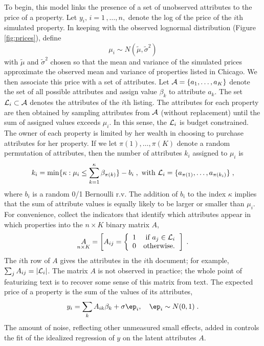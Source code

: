 \documentclass[12pt]{article}
\begin{document}
To begin, this model links the presence of a set of unobserved attributes to the price of a property.  Let $y_i, \, i = 1\,,\ldots, n,$ denote the log of the price of the $i$th simulated property.  In keeping with the observed lognormal distribution (Figure \ref{fig:prices}), define
\begin{equation}
	\mu_i \sim N(\tilde\mu, \tilde\sigma^2)
\end{equation}
with $\tilde\mu$ and $\tilde\sigma^2$ chosen so that the mean and variance of the simulated prices approximate the observed mean and variance of properties listed in Chicago.  We then associate this price with a set of attributes.  Let ${\cal A} = \{a_1,\ldots, a_K\}$ denote the set of  all possible attributes and assign value $\beta_k$ to attribute $a_k$.  The set ${\cal L}_i \subset {\cal A}$ denotes the attributes of the $i$th listing.  The attributes for each property are then obtained by sampling attributes from $\cal A$ (without replacement) until the sum of assigned values exceeds $\mu_i$.  In this sense, the ${\cal L}_i$ is budget constrained. The owner of each property is limited by her wealth in choosing to purchase attributes for her property.  If we let $\pi(1), \ldots, \pi(K)$ denote a random permutation of attributes, then the number of attributes $k_i$ assigned to $\mu_i$ is 
\begin{equation}
	k_i = \min \{ \kappa:  \mu_i \le \sum_{k=1}^{\kappa} \beta_{\pi(k)} \} - b_i \;,
	\mbox{ with }
	{\cal L}_i = \{a_{\pi(1)}, \ldots, a_{\pi(k_i)} \} \;,
\end{equation}
where $b_i$ is a random 0/1 Bernoulli r.v.  The addition of $b_i$ to the index $\kappa$ implies that the sum of attribute values is equally likely to be larger or smaller than $\mu_i$.  For convenience,  collect the indicators that identify which attributes appear in which properties into the $n \times K$ binary matrix $A$,
\begin{equation}
  \underset{n \times K}{A} = \left[ A_{ij} =
              \left\{ \begin{array}{cc} 1 & \mbox{ if } a_j \in {\cal L}_i \cr 0 & \mbox{otherwise.} 
                       \end{array} \right. \right]  \;.
\end{equation}
The $i$th row of $A$ gives the attributes in the $i$th document; for example, $\sum_j A_{ij} = |{\cal L}_i|$. The matrix $A$ is not observed in practice; the whole point of featurizing text is to recover some sense of this matrix from text. The expected price of a property is the sum of the values of its attributes,
\begin{equation}
	y_i = \sum_k A_{ik} \beta_k + \sigma \ep_i, \quad \ep_i \sim N(0,1) \;.
\label{eq:y}
\end{equation}
The amount of noise, reflecting other unmeasured small effects, added  in  controls the fit of the idealized regression of $y$ on the latent attributes $A$.  
\end{document}
